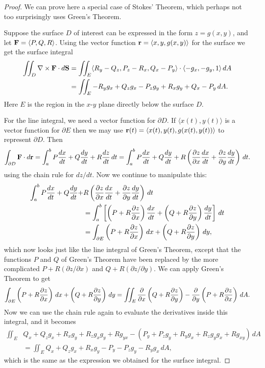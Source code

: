 \begin{proof}
We can prove here a special case of Stokes' Theorem, which perhaps
not too surprisingly uses Green's Theorem.

Suppose the surface $D$ of interest can be expressed in the form
$z=g(x,y)$, and let ${\bf F}=\langle P,Q,R\rangle$. Using the vector
function ${\bf r}=\langle x,y,g(x,y)\rangle$ for the surface we get the
surface integral
\begin{align*}
\iint_{D} \nabla\times{\bf F}\cdot d{\bf S}&=
\iint_{E} \langle R_y-Q_z,P_z-R_x,Q_x-P_y\rangle\cdot
\langle -g_x,-g_y,1\rangle\,dA	\\
&=\iint_{E} -R_yg_x+Q_zg_x-P_zg_y+R_xg_y+Q_x-P_y\,dA.
\end{align*}
Here $E$ is the region in the $x$-$y$ plane directly below the surface
$D$. 

For the line integral, we need a vector function for $\partial D$. If 
$\langle x(t),y(t)\rangle$ is a vector function for 
$\partial E$ then we may use ${\bf r}(t)=\langle x(t),y(t),g(x(t),y(t))\rangle$
to represent $\partial D$. Then
$$\int_{\partial D}{\bf F}\cdot d{\bf r}
=\int_a^b P{dx\over dt}+Q{dy\over dt}+R{dz\over dt}\,dt
=\int_a^b P{dx\over dt}+Q{dy\over dt}+R\left({\partial z\over\partial
    x}{dx\over dt}+{\partial z\over\partial y}{dy\over dt}\right)\,dt.$$
using the chain rule for $dz/dt$. Now we continue to manipulate this:
\begin{align*}
\int_a^b P{dx\over dt}+Q{dy\over dt}+&R\left({\partial z\over\partial
    x}{dx\over dt}+{\partial z\over\partial y}{dy\over dt}\right)\,dt	\\
&=\int_a^b \left[\left(P+R{\partial z\over\partial x}\right){dx\over dt}+
\left(Q+R{\partial z\over\partial y}\right){dy\over dt}\right]\,dt	\\
&=\int_{\partial E} \left(P+R{\partial z\over\partial x}\right)\,dx+
\left(Q+R{\partial z\over\partial y}\right)\,dy,
\end{align*}
which now looks just like the line integral of Green's Theorem, except
that the functions $P$ and $Q$ of Green's Theorem have been replaced
by the more complicated $P+R(\partial z/\partial x)$
and $Q+R(\partial z/\partial y)$. We can apply Green's Theorem to get
$$\int_{\partial E} \left(P+R{\partial z\over\partial x}\right)\,dx+
\left(Q+R{\partial z\over\partial y}\right)\,dy=
\iint_{E} {\partial\over \partial x}\left(Q+R{\partial z\over\partial y}\right)
-{\partial\over \partial y}\left(P+R{\partial z\over\partial x}\right)\,dA.$$
Now we can use the chain rule again to evaluate the derivatives
inside this integral, and it becomes
\begin{align*}
\iint_{E} &Q_x+Q_zg_x+R_xg_y+R_zg_xg_y+Rg_{yx}-
\left(P_y+P_zg_y+R_yg_x+R_zg_yg_x+Rg_{xy}\right)\,dA	\\
&=\iint_{E} Q_x+Q_zg_x+R_xg_y-P_y-P_zg_y-R_yg_x\,dA,
\end{align*}
which is the same as the expression we obtained for the surface
integral.
\end{proof}


